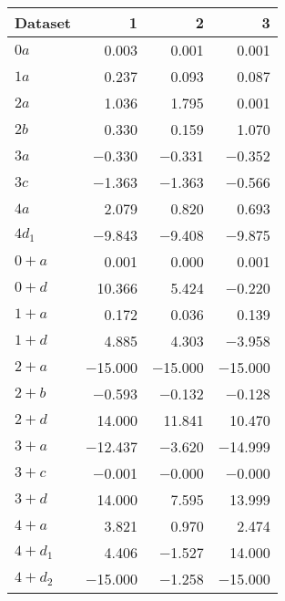 \begin{tabular}{lrrr}
\toprule
 Dataset   &       1 &       2 &       3 \\
\midrule
 $0 a$     &   \num{0.003} &   \num{0.001} &   \num{0.001} \\
 $1 a$     &   \num{0.237} &   \num{0.093} &   \num{0.087} \\
 $2 a$     &   \num{1.036} &   \num{1.795} &   \num{0.001} \\
 $2 b$     &   \num{0.330} &   \num{0.159} &   \num{1.070} \\
 $3 a$     &  \num{-0.330} &  \num{-0.331} &  \num{-0.352} \\
 $3 c$     &  \num{-1.363} &  \num{-1.363} &  \num{-0.566} \\
 $4 a$     &   \num{2.079} &   \num{0.820} &   \num{0.693} \\
 $4 d_1$   &  \num{-9.843} &  \num{-9.408} &  \num{-9.875} \\
 $0+ a$    &   \num{0.001} &   \num{0.000} &   \num{0.001} \\
 $0+ d$    &  \num{10.366} &   \num{5.424} &  \num{-0.220} \\
 $1+ a$    &   \num{0.172} &   \num{0.036} &   \num{0.139} \\
 $1+ d$    &   \num{4.885} &   \num{4.303} &  \num{-3.958} \\
 $2+ a$    & \num{-15.000} & \num{-15.000} & \num{-15.000} \\
 $2+ b$    &  \num{-0.593} &  \num{-0.132} &  \num{-0.128} \\
 $2+ d$    &  \num{14.000} &  \num{11.841} &  \num{10.470} \\
 $3+ a$    & \num{-12.437} &  \num{-3.620} & \num{-14.999} \\
 $3+ c$    &  \num{-0.001} &  \num{-0.000} &  \num{-0.000} \\
 $3+ d$    &  \num{14.000} &   \num{7.595} &  \num{13.999} \\
 $4+ a$    &   \num{3.821} &   \num{0.970} &   \num{2.474} \\
 $4+ d_1$  &   \num{4.406} &  \num{-1.527} &  \num{14.000} \\
 $4+ d_2$  & \num{-15.000} &  \num{-1.258} & \num{-15.000} \\
\bottomrule
\end{tabular}